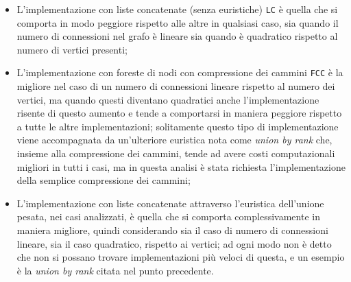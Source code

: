 \begin{itemize}
    \item L'implementazione con liste concatenate (senza euristiche) \texttt{LC} è quella che si comporta in modo peggiore
          rispetto alle altre in qualsiasi caso, sia quando il numero di connessioni nel grafo è lineare sia quando è quadratico
          rispetto al numero di vertici presenti;
    \item L'implementazione con foreste di nodi con compressione dei cammini \texttt{FCC} è la migliore nel caso di un numero
          di connessioni lineare rispetto al numero dei vertici, ma quando questi diventano quadratici anche l'implementazione risente
          di questo aumento e tende a comportarsi in maniera peggiore rispetto a tutte le altre implementazioni; solitamente questo tipo
          di implementazione viene accompagnata da un'ulteriore euristica nota come \textit{union by rank} che,
          insieme alla compressione dei cammini, tende ad avere costi computazionali migliori in tutti i casi,
          ma in questa analisi è stata richiesta l'implementazione della semplice compressione dei cammini;
    \item L'implementazione con liste concatenate attraverso l'euristica dell'unione pesata, nei casi analizzati, è quella che si comporta
          complessivamente in maniera migliore, quindi considerando sia il caso di numero di connessioni lineare, sia il caso quadratico,
          rispetto ai vertici; ad ogni modo non è detto che non si possano trovare implementazioni più veloci di questa, e un esempio è la
          \textit{union by rank} citata nel punto precedente.
\end{itemize}


